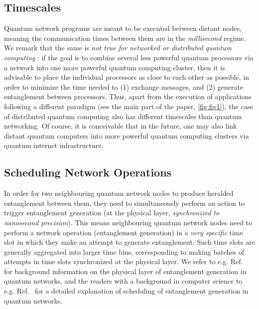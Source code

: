 \subsection{Timescales}

Quantum network programs are meant to be executed between distant nodes, meaning the communication times between them are in the \emph{millisecond} regime. We remark that the same is \emph{not true for networked or distributed quantum computing }: if the goal is to combine several less powerful quantum processors via a network into one more powerful quantum computing cluster, then it is advisable to place the individual processors as close to each other as possible, in order to minimize the time needed to (1) exchange messages, and (2) generate entanglement between processors. Thus, apart from the execution of applications following a different paradigm (see the main part of the paper, \cref{fig:fig1}),
the case of distributed quantum computing also has different timescales than quantum networking. Of course, it is conceivable that in the future, one may also link distant quantum computers into more powerful quantum computing clusters via quantum internet infrastructure.


\subsection{Scheduling Network Operations}

In order for two neighbouring quantum network nodes to produce heralded entanglement between them, they need to simultaneously perform an action to trigger entanglement generation (at the physical layer, \emph{synchronized to nanosecond precision}). This means neighbouring quantum network nodes need to perform a network operation (entanglement generation) in a \emph{very specific} time slot in which they make an attempt to generate entanglement. Such time slots are generally aggregated into larger time bins, corresponding to making batches of attempts in time slots synchronized at the physical layer. We refer to e.g. Ref.~\cite{pompili_2022_experimental} for background information on the physical layer of entanglement generation in quantum networks, and the readers with a background in computer science to e.g. Ref.~\cite{dahlberg_2019_egp} for a detailed explanation of scheduling of entanglement generation in quantum networks.

